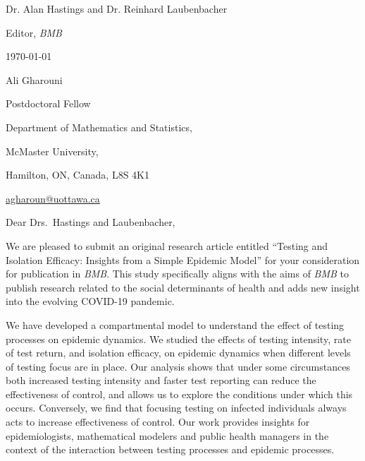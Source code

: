 \documentclass[12pt,letterpaper]{letter}
\newcommand{\journalname}{\emph{BMB}}
\begin{document}
\begin{multicols}{2}
\footnotesize
\begin{flushleft}

Dr. Alan Hastings and Dr. Reinhard Laubenbacher

Editor, \journalname{}

\vfill

{\normalsize \mydate
\today}
\end{flushleft}

\columnbreak

\begin{flushright}
Ali Gharouni

Postdoctoral Fellow 

Department of Mathematics and Statistics,

McMaster University,

Hamilton, ON, Canada, L8S 4K1

\href{mailto:agharoun@uottawa.ca}{agharoun@uottawa.ca}
\end{flushright}

\end{multicols}

\setlength{\parskip}{1em}
\thispagestyle{empty}

\vspace{-1em}

Dear Drs.\ Hastings and Laubenbacher,

We are pleased to submit an original research article entitled
``Testing and Isolation Efficacy: Insights from a Simple Epidemic Model'' for your consideration for publication in \journalname{}. This study specifically aligns with the aims of \journalname{} to publish research related to the social determinants of health and adds new insight into the evolving COVID-19 pandemic.

We have developed a compartmental model to understand the effect of testing processes on epidemic dynamics. We studied the effects of testing intensity, rate of test return, and isolation efficacy, on epidemic dynamics when different levels of testing focus are in place. Our analysis shows that under some circumstances both increased testing intensity and faster test reporting can reduce the effectiveness of control, and allows us to explore the conditions under which this occurs. Conversely, we find that focusing testing on infected individuals always acts to increase effectiveness of control. Our work provides insights for epidemiologists, mathematical modelers and public health managers in the context of the interaction between testing processes and epidemic processes.
\end{document}
